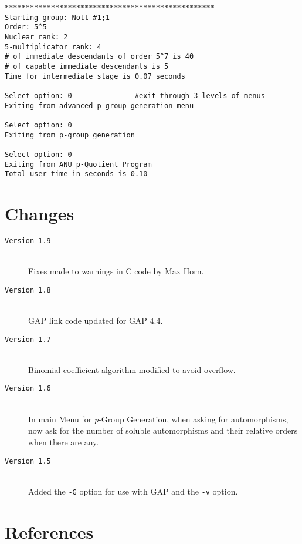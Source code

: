 \documentclass[12pt]{article}
\begin{document}
\begin{verbatim}
**************************************************
Starting group: Nott #1;1
Order: 5^5
Nuclear rank: 2
5-multiplicator rank: 4
# of immediate descendants of order 5^7 is 40
# of capable immediate descendants is 5
Time for intermediate stage is 0.07 seconds

Select option: 0               #exit through 3 levels of menus
Exiting from advanced p-group generation menu

Select option: 0
Exiting from p-group generation

Select option: 0
Exiting from ANU p-Quotient Program
Total user time in seconds is 0.10
\end{verbatim}

\section{Changes}
\begin{description}
  \item[\texttt{Version 1.9}]\ \\
     Fixes made to warnings in C code by Max Horn.
  \item[\texttt{Version 1.8}]\ \\
     \textsf{GAP} link code updated for \textsf{GAP} 4.4.
  \item[\texttt{Version 1.7}]\ \\
     Binomial coefficient algorithm modified to avoid overflow.
  \item[\texttt{Version 1.6}]\ \\
     In main Menu for {\it p}-Group Generation, when asking for 
     automorphisms, now ask for the number of soluble automorphisms
     and their relative orders when there are any.
  \item[\texttt{Version 1.5}]\ \\
     Added the \texttt{-G} option for use with \textsf{GAP} and the
     \texttt{-v} option.
\end{description}
\pagebreak
\section*{\centering References}
\end{document}
